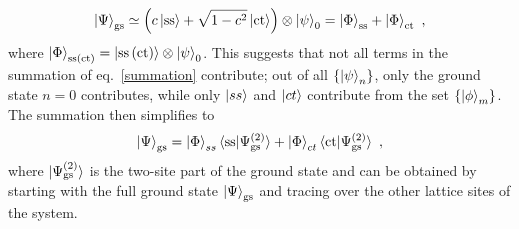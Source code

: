 \documentclass{iopart}
\begin{document}
\begin{eqnarray}
	\ket{\Psi}_\text{gs} \simeq \left(c\ket{\text{ss}} + \sqrt{1-c^2}\ket{\text{ct}}\right)  \otimes \ket{\psi}_0 = \ket{\Phi}_\text{ss} + \ket{\Phi}_\text{ct}~,
\end{eqnarray}
where \(\ket{\Phi}_\text{ss(ct)} = \ket{\text{ss}\left( \text{ct} \right)}\otimes\ket{\psi}_0 \).
This suggests that not all terms in the summation of eq.~\eqref{summation} contribute; out of all \(\left\{ \ket{\psi}_n \right\} \), only the ground state \(n=0\) contributes, while only \(\ket{ss}\) and \(\ket{ct}\) contribute from the set \(\left\{ \ket{\phi}_m \right\} \). The summation then simplifies to
\begin{eqnarray}
	\label{gs-ss}
	\ket{\Psi}_\text{gs} = \ket{\Phi}_{ss}\braket{\text{ss}|\Psi^{(2)}_\text{gs}} + \ket{\Phi}_{ct}\braket{\text{ct}|\Psi^{(2)}_\text{gs}}~,
\end{eqnarray}
where \(\ket{\Psi^{(2)}_\text{gs}}\) is the two-site part of the ground state and can be obtained by starting with the full ground state \(\ket{\Psi}_\text{gs}\) and tracing over the other lattice sites of the system.
\end{document}

